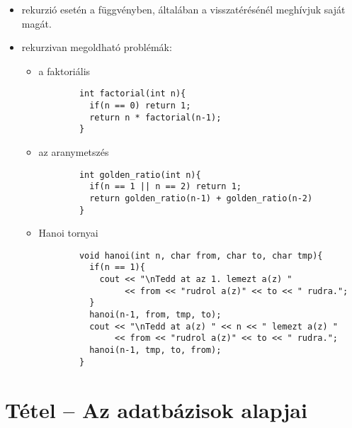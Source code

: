\documentclass[main.tex]{subfiles}
\begin{document}
  \begin{itemize}
    \item rekurzió esetén a függvényben, általában
    a visszatérésénél meghívjuk saját magát.

    \item rekurzivan megoldható problémák:
    \begin{itemize}
      \item a faktoriális
      \begin{lstlisting}
        int factorial(int n){
          if(n == 0) return 1;
          return n * factorial(n-1);
        }
      \end{lstlisting}

      \item az aranymetszés
      \begin{lstlisting}
        int golden_ratio(int n){
          if(n == 1 || n == 2) return 1;
          return golden_ratio(n-1) + golden_ratio(n-2)
        }
      \end{lstlisting}

      \item Hanoi tornyai
      \begin{lstlisting}
        void hanoi(int n, char from, char to, char tmp){
          if(n == 1){
            cout << "\nTedd at az 1. lemezt a(z) "
                 << from << "rudrol a(z)" << to << " rudra.";
          }
          hanoi(n-1, from, tmp, to);
          cout << "\nTedd at a(z) " << n << " lemezt a(z) "
               << from << "rudrol a(z)" << to << " rudra.";
          hanoi(n-1, tmp, to, from);
        }
      \end{lstlisting}
    \end{itemize}
  \end{itemize}



  \section{Tétel – Az adatbázisok alapjai} %
  
\end{document}
